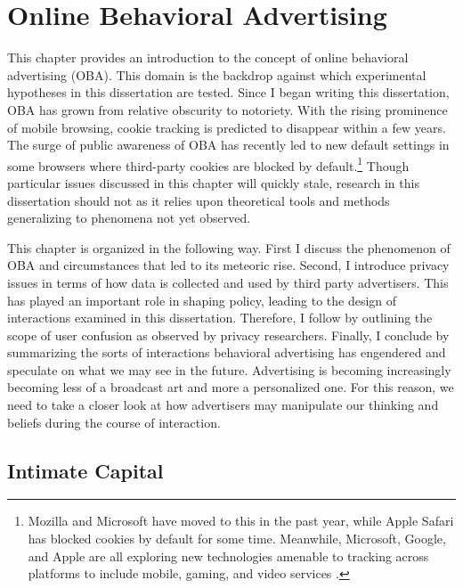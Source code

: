 \chapter{Online Behavioral Advertising}
\label{onlinebehavioraladvertising}

This chapter provides an introduction to the concept of online behavioral advertising (OBA). This domain is the backdrop against which experimental hypotheses in this dissertation are tested. Since I began writing this dissertation, OBA has grown from relative obscurity to notoriety. With the rising prominence of mobile browsing, cookie tracking is predicted to disappear within a few years. The surge of public awareness of OBA has recently led to new default settings in some browsers where third-party cookies are blocked by  default.\footnote{Mozilla and Microsoft have moved to this in the past year, while Apple Safari has blocked cookies by default for some time. Meanwhile, Microsoft, Google, and Apple are all exploring new technologies amenable to tracking across platforms to include mobile, gaming, and video services \citep{DOrazio:2013tx}.}  Though particular issues discussed in this chapter will quickly stale, research in this dissertation should not as it relies upon theoretical tools and methods generalizing to phenomena not yet observed. 

This chapter is organized in the following way. First I discuss the phenomenon of OBA and circumstances that led to its meteoric rise. Second, I introduce privacy issues in terms of how data is collected and used by third party advertisers. This has played an important role in shaping policy, leading to the design of interactions examined in this dissertation. Therefore, I follow by outlining the scope of user confusion as observed by privacy researchers. Finally, I conclude by summarizing the sorts of interactions behavioral advertising has engendered and speculate on what we may see in the future. Advertising is becoming increasingly becoming less of a broadcast art and more a personalized one. For this reason, we need to take a closer look at how advertisers may manipulate our thinking and beliefs during the course of interaction.

\section{Intimate Capital}
\label{intimatecapital}

